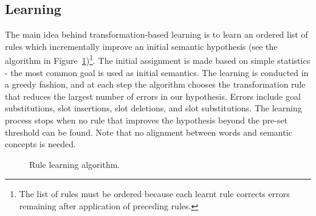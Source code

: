 \documentclass{article}
\begin{document}
\subsection{Learning} \label{sec:tbl:learning}
The main idea behind transformation-based learning \cite{brill95} is to learn an ordered list of rules which incrementally improve an initial semantic hypothesis (see the algorithm in Figure~\ref{alg:tbl:learning})\footnote{The list of rules must be ordered because each learnt rule corrects errors remaining after application of preceding rules.}. The initial assignment is made based on simple statistics - the most common goal is used as initial semantics. The learning is conducted in a greedy fashion, and at each step the algorithm chooses the transformation rule that reduces the largest number of errors in our hypothesis. Errors include goal substitutions, slot insertions, slot deletions, and slot substitutions. The learning process stops when no rule that improves the hypothesis beyond the pre-set threshold can be found. Note that no alignment between words and semantic concepts is needed.


\begin{figure}
\vspace{-0.25cm}
\caption{Rule learning algorithm.}
\label{alg:tbl:learning}
\end{figure} 
\end{document}
